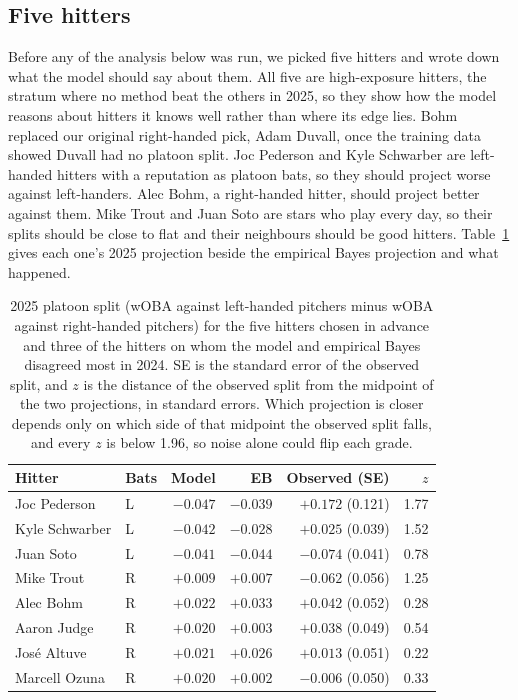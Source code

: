 \documentclass[11pt,letterpaper]{article}
\begin{document}
\subsection{Five hitters}
\label{sec:anchors}

Before any of the analysis below was run, we picked five hitters and wrote down what the model should say about them. All five are high-exposure hitters, the stratum where no method beat the others in 2025, so they show how the model reasons about hitters it knows well rather than where its edge lies. Bohm replaced our original right-handed pick, Adam Duvall, once the training data showed Duvall had no platoon split. Joc Pederson and Kyle Schwarber are left-handed hitters with a reputation as platoon bats, so they should project worse against left-handers. Alec Bohm, a right-handed hitter, should project better against them. Mike Trout and Juan Soto are stars who play every day, so their splits should be close to flat and their neighbours should be good hitters. Table~\ref{tab:cases} gives each one's 2025 projection beside the empirical Bayes projection and what happened.

\begin{table}[t]
\centering\small
\begin{tabular}{llrrrr}
\toprule
Hitter & Bats & Model & EB & Observed (SE) & $z$ \\
\midrule
Joc Pederson & L & $-0.047$ & $-0.039$ & $+0.172$ (0.121) & 1.77 \\
Kyle Schwarber & L & $-0.042$ & $-0.028$ & $+0.025$ (0.039) & 1.52 \\
Juan Soto & L & $-0.041$ & $-0.044$ & $-0.074$ (0.041) & 0.78 \\
Mike Trout & R & $+0.009$ & $+0.007$ & $-0.062$ (0.056) & 1.25 \\
Alec Bohm & R & $+0.022$ & $+0.033$ & $+0.042$ (0.052) & 0.28 \\
\midrule
Aaron Judge & R & $+0.020$ & $+0.003$ & $+0.038$ (0.049) & 0.54 \\
José Altuve & R & $+0.021$ & $+0.026$ & $+0.013$ (0.051) & 0.22 \\
Marcell Ozuna & R & $+0.020$ & $+0.002$ & $-0.006$ (0.050) & 0.33 \\
\bottomrule
\end{tabular}
\caption{2025 platoon split (wOBA against left-handed pitchers minus wOBA against right-handed pitchers) for the five hitters chosen in advance and three of the hitters on whom the model and empirical Bayes disagreed most in 2024. SE is the standard error of the observed split, and $z$ is the distance of the observed split from the midpoint of the two projections, in standard errors. Which projection is closer depends only on which side of that midpoint the observed split falls, and every $z$ is below 1.96, so noise alone could flip each grade.}
\label{tab:cases}
\end{table}
\end{document}
